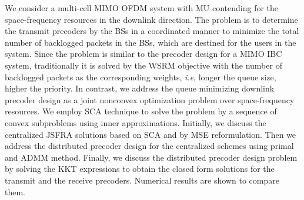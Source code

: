We consider a multi-cell \ac{MIMO} \ac{OFDM} system with \ac{MU} contending for the space-frequency resources in the downlink direction. The problem is to determine the transmit precoders by the \acp{BS} in a coordinated manner to minimize the total number of backlogged packets in the \acp{BS}, which are destined for the users in the system. Since the problem is similar to the precoder design for a \ac{MIMO} \ac{IBC} system, traditionally it is solved by the \ac{WSRM} objective with the number of backlogged packets as the corresponding weights, \textit{i.e}, longer the queue size, higher the priority. In contrast, we address the queue minimizing downlink precoder design as a joint nonconvex optimization problem over space-frequency resources. We employ \ac{SCA} technique to solve the problem by a sequence of convex subproblems using inner approximations. Initially, we discuss the centralized \ac{JSFRA} solutions based on \ac{SCA} and by \ac{MSE} reformulation. Then we address the distributed precoder design for the centralized schemes using primal and \ac{ADMM} method. Finally, we discuss the distributed precoder design problem by solving the \ac{KKT} expressions to obtain the closed form solutions for the transmit and the receive precoders. Numerical results are shown to compare them.


